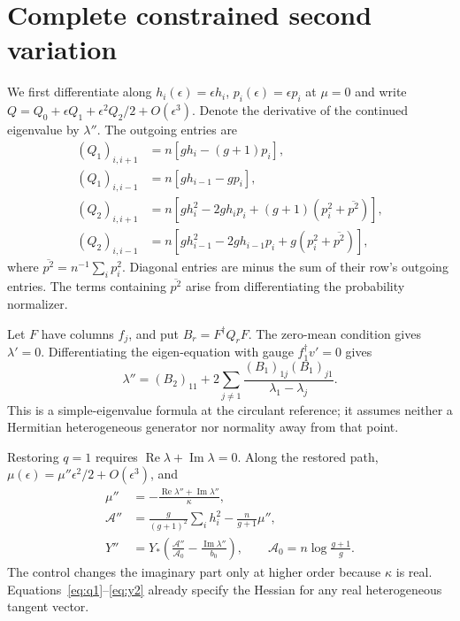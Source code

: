 \documentclass[aps,pre,onecolumn,11pt,notitlepage,nofootinbib]{revtex4-2}
\newcommand{\Repart}{\operatorname{Re}}
\newcommand{\Impart}{\operatorname{Im}}
\newcommand{\mean}[1]{\overline{#1}}
\begin{document}
\section{Complete constrained second variation}
We first differentiate along $h_i(\epsilon)=\epsilon h_i$, $p_i(\epsilon)=\epsilon p_i$ at $\mu=0$ and write $Q=Q_0+\epsilon Q_1+\epsilon^2Q_2/2+O(\epsilon^3)$. Denote the derivative of the continued eigenvalue by $\lambda''$. The outgoing entries are
\begin{align}
 (Q_1)_{i,i+1}&=n[gh_i-(g+1)p_i],\nonumber\\
 (Q_1)_{i,i-1}&=n[gh_{i-1}-gp_i],\label{eq:q1}\\
 (Q_2)_{i,i+1}&=n\left[gh_i^2-2gh_ip_i
                +(g+1)(p_i^2+\mean{p^2})\right],\nonumber\\
 (Q_2)_{i,i-1}&=n\left[gh_{i-1}^2-2gh_{i-1}p_i
                +g(p_i^2+\mean{p^2})\right],\label{eq:q2}
\end{align}
where $\mean{p^2}=n^{-1}\sum_i p_i^2$. Diagonal entries are minus the sum of their row's outgoing entries. The terms containing $\mean{p^2}$ arise from differentiating the probability normalizer.

Let $F$ have columns $f_j$, and put $B_r=F^\dagger Q_rF$. The zero-mean condition gives $\lambda'=0$. Differentiating the eigen-equation with gauge $f_1^\dagger v'=0$ gives
\begin{equation}
 \lambda''=(B_2)_{11}
       +2\sum_{j\ne1}\frac{(B_1)_{1j}(B_1)_{j1}}{\lambda_1-\lambda_j}.
 \label{eq:lambda2}
\end{equation}
This is a simple-eigenvalue formula at the circulant reference; it assumes neither a Hermitian heterogeneous generator nor normality away from that point.

Restoring $q=1$ requires $\Repart\lambda+\Impart\lambda=0$. Along the restored path, $\mu(\epsilon)=\mu''\epsilon^2/2+O(\epsilon^3)$, and
\begin{align}
 \mu''&=-\frac{\Repart\lambda''+\Impart\lambda''}{\kappa},\label{eq:mu2}\\
 \mathcal A''&=\frac{g}{(g+1)^2}\sum_i h_i^2-\frac{n}{g+1}\mu'',\label{eq:a2}\\
 Y''&=Y_*\left(\frac{\mathcal A''}{\mathcal A_0}
                   -\frac{\Impart\lambda''}{b_0}\right),\qquad
 \mathcal A_0=n\log\frac{g+1}{g}.\label{eq:y2}
\end{align}
The control changes the imaginary part only at higher order because $\kappa$ is real. Equations~\eqref{eq:q1}--\eqref{eq:y2} already specify the Hessian for any real heterogeneous tangent vector.
\end{document}
